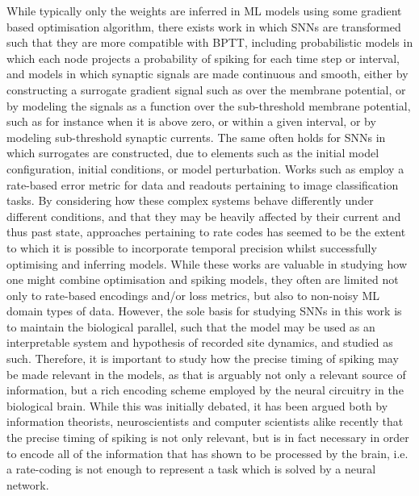\documentclass[mphil,deptreport,ianc]{infthesis} %
\begin{document}
While typically only the weights are inferred in ML models using some gradient based optimisation algorithm, there exists work in which SNNs are transformed such that they are more compatible with BPTT, including probabilistic models in which each node projects a probability of spiking for each time step or interval, and models in which synaptic signals are made continuous and smooth, either by constructing a surrogate gradient signal such as over the membrane potential, or by modeling the signals as a function over the sub-threshold membrane potential, such as for instance when it is above zero, or within a given interval, or by modeling sub-threshold synaptic currents.
The same often holds for SNNs in which surrogates are constructed, due to elements such as the initial model configuration, initial conditions, or model perturbation.
Works such as \cite{Jin2018} employ a rate-based error metric for data and readouts pertaining to image classification tasks.
By considering how these complex systems behave differently under different conditions, and that they may be heavily affected by their current and thus past state, approaches pertaining to rate codes has seemed to be the extent to which it is possible to incorporate temporal precision whilst successfully optimising and inferring models.
While these works are valuable in studying how one might combine optimisation and spiking models, they often are limited not only to rate-based encodings and/or loss metrics, but also to non-noisy ML domain types of data.
However, the sole basis for studying SNNs in this work is to maintain the biological parallel, such that the model may be used as an interpretable system and hypothesis of recorded site dynamics, and studied as such.
Therefore, it is important to study how the precise timing of spiking may be made relevant in the models, as that is arguably not only a relevant source of information, but a rich encoding scheme employed by the neural circuitry in the biological brain.
While this was initially debated, it has been argued both by information theorists, neuroscientists and computer scientists alike recently that the precise timing of spiking is not only relevant, but is in fact necessary in order to encode all of the information that has shown to be processed by the brain, i.e. a rate-coding is not enough to represent a task which is solved by a neural network.
\end{document}

